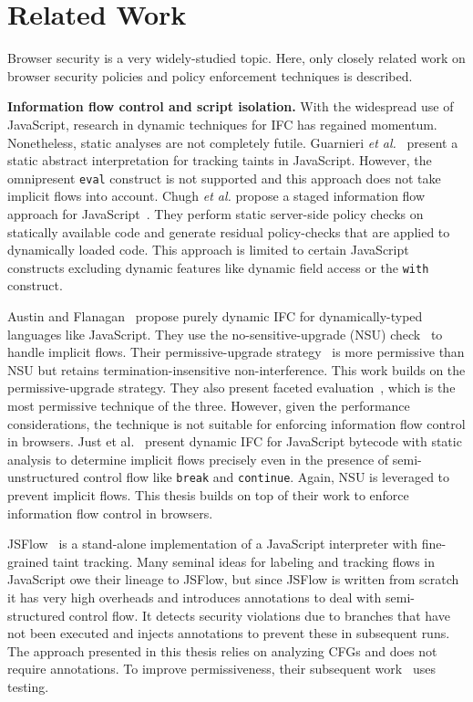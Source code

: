 \chapter{Related Work}
\label{ch:related}

Browser security is a very widely-studied topic. Here, only closely
related work on browser security policies and policy enforcement 
techniques is described. 

\medskip\noindent\textbf{Information flow control and script
  isolation.} With the widespread use of JavaScript,
research in dynamic techniques for IFC has regained momentum.
Nonetheless, static analyses are not completely futile. Guarn\-ieri
\emph{et al.}~\cite{guarnieri11ISSTA} present a static abstract
interpretation for tracking taints in JavaScript. However, the
omnipresent \texttt{eval} construct is not supported and this approach
does not take implicit flows into account.  Chugh \emph{et al.}
propose a staged information flow approach for 
JavaScript~\cite{stagedIFC}. They perform static server-side policy
checks on statically available code and generate residual
policy-checks that are applied to dynamically loaded code.  This
approach is limited to certain JavaScript constructs excluding dynamic 
features like dynamic field access or the \texttt{with} construct.

Austin and Flanagan~\cite{plas09} propose purely dynamic IFC for
dynamically-typed languages like JavaScript. They use the
no-sensitive-upgrade (NSU) check~\cite{zdancewic02PhD} to handle
implicit flows. Their per\-mis\-sive-upgrade strategy~\cite{plas10} is
more permissive than NSU but retains ter\-mi\-na\-tion-insensitive
non-interference. This work builds on the permissive-upgrade
strategy. They also present faceted evaluation~\cite{austin12POPL},
which is the most permissive technique of the three. However, given
the performance considerations, the technique is not suitable for
enforcing information flow control in browsers.  Just
et al.~\cite{just11PLASTIC} present dynamic IFC for JavaScript
bytecode with static analysis to determine implicit flows precisely
even in the presence of semi-unstructured control flow like
\texttt{break} and \texttt{continue}. Again, NSU is leveraged to
prevent implicit flows. This thesis builds on top of their work to
enforce information flow control in browsers.

JSFlow~\cite{csf12,jsflow} is a stand-alone implementation of
a JavaScript interpreter with fine-grained taint tracking. Many
seminal ideas for labeling and tracking flows in JavaScript owe their
lineage to JSFlow, but since JSFlow is written from scratch it has
very high overheads and  introduces annotations to deal with
semi-structured control flow. It detects
security violations due to branches that have not been executed and
injects annotations to prevent these in subsequent runs. The approach
presented in this thesis relies on analyzing CFGs and does not require
annotations. To improve permissiveness,
their subsequent work~\cite{esorics12} uses testing. 

